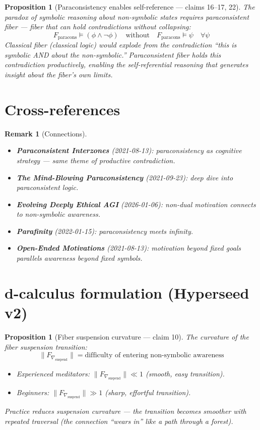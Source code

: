 \documentclass[11pt,a4paper]{article}
\newtheorem{proposition}[definition]{Proposition}
\newtheorem{remark}[definition]{Remark}
\begin{document}
\begin{proposition}[Paraconsistency enables self-reference --- claims 16--17, 22]
The paradox of symbolic reasoning about non-symbolic states requires
paraconsistent fiber --- fiber that can hold contradictions without
collapsing:
\[
  F_{\text{paracons}} \models (\phi \wedge \neg\phi) \quad
  \text{without} \quad F_{\text{paracons}} \models \psi \quad \forall \psi
\]
Classical fiber (classical logic) would explode from the contradiction
``this is symbolic AND about the non-symbolic.'' Paraconsistent fiber
holds this contradiction productively, enabling the self-referential
reasoning that generates insight about the fiber's own limits.
\end{proposition}

\section{Cross-references}

\begin{remark}[Connections]
\begin{itemize}
\item \textbf{Paraconsistent Interzones} (2021-08-13): paraconsistency
  as cognitive strategy --- same theme of productive contradiction.
\item \textbf{The Mind-Blowing Paraconsistency} (2021-09-23): deep dive
  into paraconsistent logic.
\item \textbf{Evolving Deeply Ethical AGI} (2026-01-06): non-dual
  motivation connects to non-symbolic awareness.
\item \textbf{Parafinity} (2022-01-15): paraconsistency meets infinity.
\item \textbf{Open-Ended Motivations} (2021-08-13): motivation beyond
  fixed goals parallels awareness beyond fixed symbols.
\end{itemize}
\end{remark}

\section{d-calculus formulation (Hyperseed v2)}

\begin{proposition}[Fiber suspension curvature --- claim 10]
\label{prop:suspension}
The curvature of the fiber suspension transition:
\[
  \|F_{\nabla_{\text{suspend}}}\| = \text{difficulty of entering
    non-symbolic awareness}
\]
\begin{itemize}
  \item Experienced meditators: $\|F_{\nabla_{\text{suspend}}}\| \ll 1$
    (smooth, easy transition).
  \item Beginners: $\|F_{\nabla_{\text{suspend}}}\| \gg 1$ (sharp,
    effortful transition).
\end{itemize}
Practice reduces suspension curvature --- the transition becomes smoother
with repeated traversal (the connection ``wears in'' like a path through
a forest).
\end{proposition}
\end{document}
